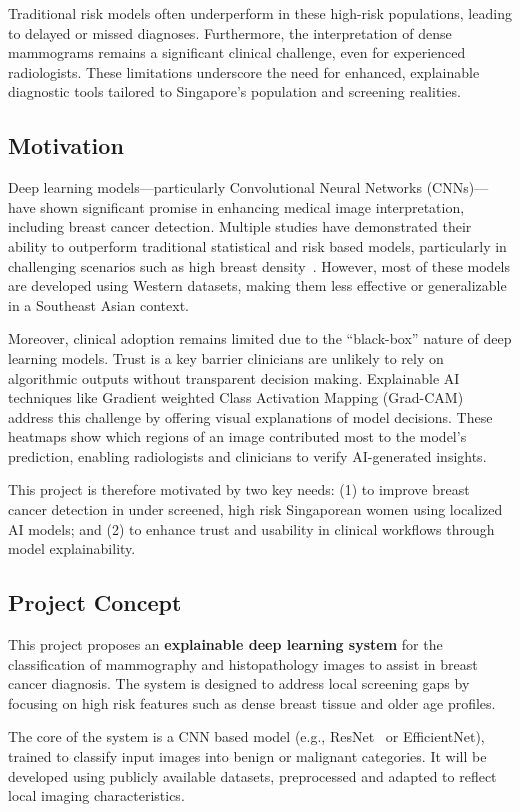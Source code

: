 \documentclass[12pt]{article}
\begin{document}
Traditional risk models often underperform in these high-risk populations, leading to delayed or missed diagnoses. Furthermore, the interpretation of dense mammograms remains a significant clinical challenge, even for experienced radiologists. These limitations underscore the need for enhanced, explainable diagnostic tools tailored to Singapore’s population and screening realities.

\subsection{Motivation}
Deep learning models—particularly Convolutional Neural Networks (CNNs)—have shown significant promise in enhancing medical image interpretation, including breast cancer detection. Multiple studies have demonstrated their ability to outperform traditional statistical and risk based models, particularly in challenging scenarios such as high breast density~\cite{1,7,13}. However, most of these models are developed using Western datasets, making them less effective or generalizable in a Southeast Asian context.

Moreover, clinical adoption remains limited due to the ``black-box'' nature of deep learning models. Trust is a key barrier clinicians are unlikely to rely on algorithmic outputs without transparent decision making. Explainable AI techniques like Gradient weighted Class Activation Mapping (Grad-CAM)~\cite{5} address this challenge by offering visual explanations of model decisions. These heatmaps show which regions of an image contributed most to the model's prediction, enabling radiologists and clinicians to verify AI-generated insights.

This project is therefore motivated by two key needs: (1) to improve breast cancer detection in under screened, high risk Singaporean women using localized AI models; and (2) to enhance trust and usability in clinical workflows through model explainability.

\subsection{Project Concept}
This project proposes an \textbf{explainable deep learning system} for the classification of mammography and histopathology images to assist in breast cancer diagnosis. The system is designed to address local screening gaps by focusing on high risk features such as dense breast tissue and older age profiles.

The core of the system is a CNN based model (e.g., ResNet~\cite{17} or EfficientNet), trained to classify input images into benign or malignant categories. It will be developed using publicly available datasets, preprocessed and adapted to reflect local imaging characteristics.
\end{document}
